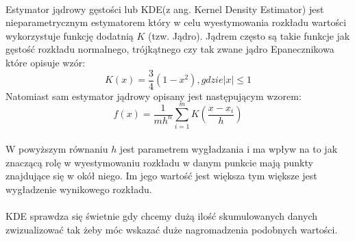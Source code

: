 \paragraph{}
Estymator jądrowy gęstości lub KDE(z ang. Kernel Density Estimator) jest nieparametrycznym estymatorem który w celu wyestymowania rozkładu wartości wykorzystuje funkcję dodatnią $K$ (tzw. Jądro). Jądrem często są takie funkcje jak gęstość rozkładu normalnego, trójkątnego czy tak zwane jądro Epanecznikowa które opisuje wzór:
\begin{equation}
	K(x) = \dfrac{3}{4}\left ( 1 - x^2 \right ), gdzie \left | x \right | \leq 1
\end{equation}
Natomiast sam estymator jądrowy opisany jest następującym wzorem:
\begin{equation}
	\hat{f}(x) = \dfrac{1}{mh^n}\sum_{i=1}^{m} K\left ( \dfrac{x - x_i}{h}  \right )
\end{equation}
\paragraph{}
W powyższym równaniu $h$ jest parametrem wygładzania i ma wpływ na to jak znaczącą rolę w wyestymowaniu rozkładu w danym punkcie mają punkty znajdujące się w okół niego. Im jego wartość jest większa tym większe jest wygładzenie wynikowego rozkładu.
\paragraph{}
KDE sprawdza się świetnie gdy chcemy dużą ilość skumulowanych danych zwizualizować tak żeby móc wskazać duże nagromadzenia podobnych wartości.